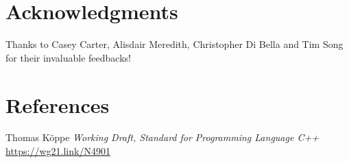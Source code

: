 \documentclass{wg21}
\begin{document}
%
%

\section{Acknowledgments}

Thanks to Casey Carter, Alisdair Meredith, Christopher Di Bella and Tim Song for their invaluable feedbacks!

\section{References}
\renewcommand{\section}[2]{}%



\begin{thebibliography}{9}

Thomas Köppe
\emph{Working Draft, Standard for Programming Language C++}\newline
\url{https://wg21.link/N4901}


\end{thebibliography}
\end{document}
